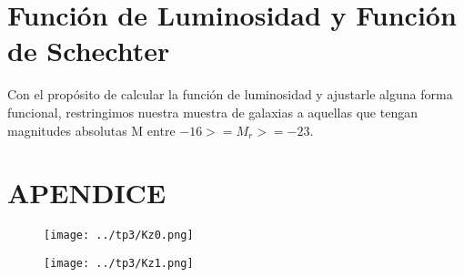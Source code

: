 \documentclass[a4paper,10pt]{article}
\def\aj {AJ}
\def\mnras {MNRAS}
\begin{document}
\section{Funci\'on de Luminosidad y Funci\'on de Schechter }

Con el prop\'osito de calcular la funci\'on de luminosidad y ajustarle alguna forma funcional, restringimos nuestra muestra de galaxias a aquellas que tengan magnitudes absolutas M entre $-16 >= M_{r} >= -23 $. 

\section{APENDICE}
\begin{figure}[H]
 \centering
 \texttt{[image: ../tp3/Kz0.png]}
 \label{fig:1}
\end{figure}
\begin{figure}[H]
 \centering
 \texttt{[image: ../tp3/Kz1.png]}
\end{figure}



















\end{document}
